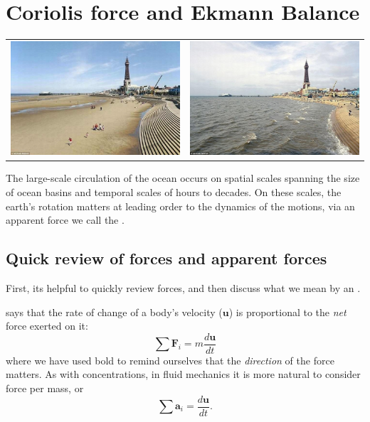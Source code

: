 
\chapter{Coriolis force and Ekmann Balance}
\label{ch:coriolis}

\begin{tabular}{ll}
    \includegraphics[width=3.2in]{figs/Waves/LowTide.jpg} & \includegraphics[width=3.2in]{figs/Waves/HighTide.jpg}
\end{tabular}

The large-scale circulation of the ocean occurs on spatial scales spanning the size of ocean basins and temporal scales of hours to decades.  On these scales, the earth's rotation matters at leading order to the dynamics of the motions, via an apparent force we call the .

\section{Quick review of forces and apparent forces}

First, its helpful to quickly review forces, and then discuss what we mean by an .  

 says that the rate of change of a body's velocity ($\mathbf{u}$) is proportional to the \emph{net} force exerted on it:
\begin{equation}
    \sum{\mathbf{F}_i} = m \frac{d \mathbf{u}}{dt}
\end{equation}
where we have used bold to remind ourselves that the \emph{direction} of the force matters.  As with concentrations, in fluid mechanics it is more natural to consider force per mass, or 
\begin{equation}
    \sum{\mathbf{a}_i} = \frac{d \mathbf{u}}{dt}.
\end{equation}

